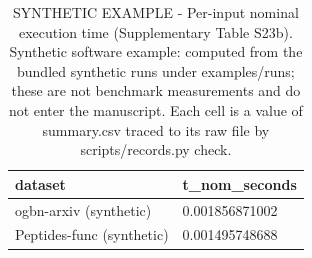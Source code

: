 \begin{table}[t]
\centering
\small
\caption{SYNTHETIC EXAMPLE - Per-input nominal execution time (Supplementary Table S23b). Synthetic software example: computed from the bundled synthetic runs under examples/runs; these are not benchmark measurements and do not enter the manuscript. Each cell is a value of summary.csv traced to its raw file by scripts/records.py check.}
\label{tab:records-nominal_time}
\begin{tabular}{ll}
\hline
dataset & t\_nom\_seconds \\
\hline
ogbn-arxiv (synthetic) & 0.001856871002 \\
Peptides-func (synthetic) & 0.001495748688 \\
\hline
\end{tabular}
\end{table}
